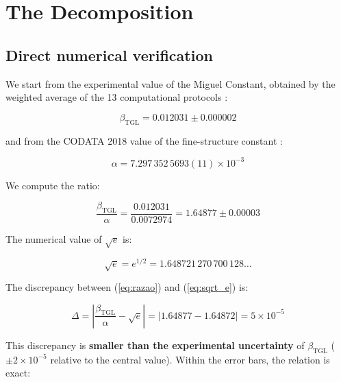 \documentclass[12pt,a4paper,twoside]{article}
\newcommand{\betatgl}{\beta_{\!\scriptscriptstyle\mathrm{TGL}}}
\begin{document}

\section{The Decomposition}
\label{sec:decomposicao}

\subsection{Direct numerical verification}

We start from the experimental value of the Miguel Constant, obtained by the weighted average of the 13 computational protocols \cite{Miguel2026Fronteira}:

\begin{equation}
\betatgl = 0.012031 \pm 0.000002
\end{equation}

\noindent and from the CODATA 2018 value of the fine-structure constant \cite{CODATA2018}:

\begin{equation}
\alpha = 7.297\,352\,5693(11) \times 10^{-3}
\end{equation}

We compute the ratio:

\begin{equation}
\frac{\betatgl}{\alpha} = \frac{0.012031}{0.0072974} = 1.64877 \pm 0.00003
\label{eq:razao}
\end{equation}

The numerical value of $\sqrt{e}$ is:

\begin{equation}
\sqrt{e} = e^{1/2} = 1.648721\,270\,700\,128\ldots
\label{eq:sqrt_e}
\end{equation}

The discrepancy between (\ref{eq:razao}) and (\ref{eq:sqrt_e}) is:

\begin{equation}
\Delta = \left|\frac{\betatgl}{\alpha} - \sqrt{e}\right| = |1.64877 - 1.64872| = 5 \times 10^{-5}
\end{equation}

This discrepancy is \textbf{smaller than the experimental uncertainty} of $\betatgl$ ($\pm 2 \times 10^{-5}$ relative to the central value). Within the error bars, the relation is exact:
\end{document}

